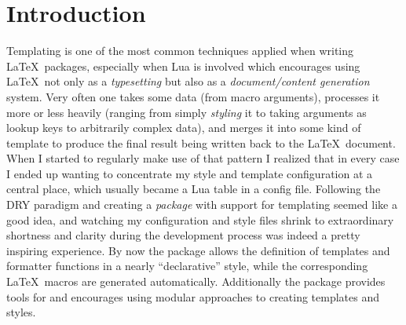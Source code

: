\documentclass{scrartcl}
\title{\luatemplates}
\subtitle{v0.8}
\author{Urs Liska}
\date{\today}
\begin{document}
\maketitle

\begin{abstract}

 is a package for Lua\LaTeX\ designed to assist package
and document authors with the recurring task of \emph{templating}.  Essentially
it eliminates the need to deal with the interfacing of the \LaTeX\ and Lua sides
of creating macros.  The package's main objectives are: maintaining  templates
and formatter functions in a central location, easily exposing them as \LaTeX\
macros, and assisting with a modular style of programming templates and styles.

\end{abstract}


\tableofcontents

\section{Introduction}

Templating is one of the most common techniques applied when writing \LaTeX\
packages, especially when Lua is involved which encourages using \LaTeX\ not
only as a \emph{typesetting} but also as a \emph{document/content generation}
system.  Very often one takes some data (from macro arguments), processes it
more or less heavily (ranging from simply \emph{styling} it to taking arguments
as lookup keys to arbitrarily complex data), and merges it into some kind of
template to produce the final result being written back to the \LaTeX\ document.
When I started to regularly make use of that pattern I realized that in every
case I ended up wanting to concentrate my style and template configuration at a
central place, which usually became a Lua table in a config file.  Following the
DRY paradigm and creating a \emph{package} with support for templating seemed
like a good idea, and watching my configuration and style files shrink to
extraordinary shortness and clarity during the development process was indeed a
pretty inspiring experience.  By now the package allows the definition of
templates and formatter functions in a nearly “declarative” style, while the
corresponding \LaTeX\ macros are generated automatically. Additionally the
package provides tools for and encourages using modular approaches to creating
templates and styles.
\end{document}

